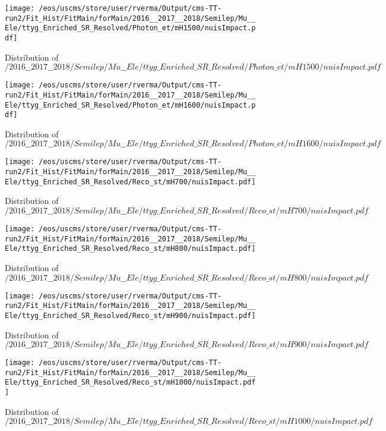 \begin{figure}
\centering
\texttt{[image: /eos/uscms/store/user/rverma/Output/cms-TT-run2/Fit\_Hist/FitMain/forMain/2016\_\_2017\_\_2018/Semilep/Mu\_\_Ele/ttyg\_Enriched\_SR\_Resolved/Photon\_et/mH1500/nuisImpact.pdf]}
\caption{Distribution of $/2016\_\_2017\_\_2018/Semilep/Mu\_\_Ele/ttyg\_Enriched\_SR\_Resolved/Photon\_et/mH1500/nuisImpact.pdf$}
\end{figure}

\begin{figure}
\centering
\texttt{[image: /eos/uscms/store/user/rverma/Output/cms-TT-run2/Fit\_Hist/FitMain/forMain/2016\_\_2017\_\_2018/Semilep/Mu\_\_Ele/ttyg\_Enriched\_SR\_Resolved/Photon\_et/mH1600/nuisImpact.pdf]}
\caption{Distribution of $/2016\_\_2017\_\_2018/Semilep/Mu\_\_Ele/ttyg\_Enriched\_SR\_Resolved/Photon\_et/mH1600/nuisImpact.pdf$}
\end{figure}

\begin{figure}
\centering
\texttt{[image: /eos/uscms/store/user/rverma/Output/cms-TT-run2/Fit\_Hist/FitMain/forMain/2016\_\_2017\_\_2018/Semilep/Mu\_\_Ele/ttyg\_Enriched\_SR\_Resolved/Reco\_st/mH700/nuisImpact.pdf]}
\caption{Distribution of $/2016\_\_2017\_\_2018/Semilep/Mu\_\_Ele/ttyg\_Enriched\_SR\_Resolved/Reco\_st/mH700/nuisImpact.pdf$}
\end{figure}

\begin{figure}
\centering
\texttt{[image: /eos/uscms/store/user/rverma/Output/cms-TT-run2/Fit\_Hist/FitMain/forMain/2016\_\_2017\_\_2018/Semilep/Mu\_\_Ele/ttyg\_Enriched\_SR\_Resolved/Reco\_st/mH800/nuisImpact.pdf]}
\caption{Distribution of $/2016\_\_2017\_\_2018/Semilep/Mu\_\_Ele/ttyg\_Enriched\_SR\_Resolved/Reco\_st/mH800/nuisImpact.pdf$}
\end{figure}

\begin{figure}
\centering
\texttt{[image: /eos/uscms/store/user/rverma/Output/cms-TT-run2/Fit\_Hist/FitMain/forMain/2016\_\_2017\_\_2018/Semilep/Mu\_\_Ele/ttyg\_Enriched\_SR\_Resolved/Reco\_st/mH900/nuisImpact.pdf]}
\caption{Distribution of $/2016\_\_2017\_\_2018/Semilep/Mu\_\_Ele/ttyg\_Enriched\_SR\_Resolved/Reco\_st/mH900/nuisImpact.pdf$}
\end{figure}

\begin{figure}
\centering
\texttt{[image: /eos/uscms/store/user/rverma/Output/cms-TT-run2/Fit\_Hist/FitMain/forMain/2016\_\_2017\_\_2018/Semilep/Mu\_\_Ele/ttyg\_Enriched\_SR\_Resolved/Reco\_st/mH1000/nuisImpact.pdf]}
\caption{Distribution of $/2016\_\_2017\_\_2018/Semilep/Mu\_\_Ele/ttyg\_Enriched\_SR\_Resolved/Reco\_st/mH1000/nuisImpact.pdf$}
\end{figure}

